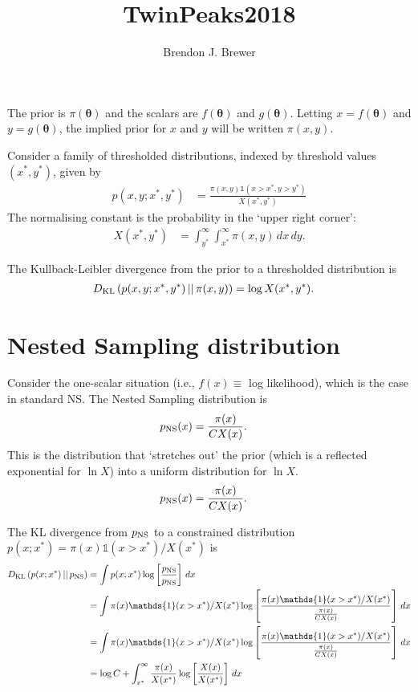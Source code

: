 \documentclass[a4paper, 12pt]{article}
\title{TwinPeaks2018}
\author{Brendon J. Brewer}
\newcommand{\btheta}{\boldsymbol{\theta}}
\begin{document}
\maketitle


\setlength{\parindent}{0pt}
\setlength{\parskip}{8pt}

The prior is $\pi(\btheta)$ and the scalars are
$f(\btheta)$ and $g(\btheta)$. Letting $x=f(\btheta)$ and $y=g(\btheta)$,
the implied prior for $x$ and $y$ will be written $\pi(x, y)$.

Consider a family of thresholded distributions, indexed by threshold
values $(x^*, y^*)$, given by
\begin{align}
p(x, y; x^*, y^*) &= \frac{\pi(x, y)\mathds{1}(x > x^*, y > y^*)}
                          {X(x^*, y^*)}
\end{align}
The normalising constant is the probability in the `upper right corner':
\begin{align}
X(x^*, y^*) &= \int_{y^*}^{\infty} \int_{x^*}^{\infty} \pi(x, y) \, dx \, dy.
\end{align}

The Kullback-Leibler divergence from the prior to a thresholded distribution
is
\begin{align}
D_{\rm KL}\left(p(x, y; x^*, y^*) \,||\, \pi(x, y)\right) &=
    \log X(x^*, y^*).
\end{align}

\section{Nested Sampling distribution}
Consider the one-scalar situation (i.e., $f(x) \equiv$ log likelihood),
which is the case in standard NS. The Nested Sampling distribution is
\begin{align}
p_{\rm NS}(x) &= \frac{\pi(x)}{C X(x)}.
\end{align}
This is the distribution that `stretches out' the prior (which is a
reflected exponential for $\ln X$) into a uniform distribution for $\ln X$.
\begin{align}
p_{\rm NS}(x) &= \frac{\pi(x)}{C X(x)}.
\end{align}

The KL divergence from $p_{\rm NS}$ to a constrained distribution
$p(x; x^*) = \pi(x)\mathds{1}(x > x^*)/X(x^*)$ is
\begin{align}
D_{\rm KL}\left(p(x; x^*) \,||\, p_{\rm NS}\right)
    &= \int p(x; x^*)
            \log \left[\frac{p_{\rm NS}}{p_{\rm NS}}\right] \, dx \\
    &= \int \pi(x)\mathds{1}(x > x^*)/X(x^*)
            \log \left[\frac{\pi(x)\mathds{1}(x > x^*)/X(x^*)}
                            {\frac{\pi(x)}{C X(x)}}\right] \, dx \\
    &= \int \pi(x)\mathds{1}(x > x^*)/X(x^*)
            \log \left[\frac{\pi(x)\mathds{1}(x > x^*)/X(x^*)}
                            {\frac{\pi(x)}{C X(x)}}\right] \, dx \\
    &= \log C + \int_{x^*}^{\infty} \frac{\pi(x)}{X(x^*)}
            \log \left[\frac{X(x)}{X(x^*)}\right] \, dx
\end{align}
\end{document}
